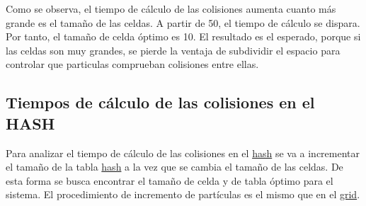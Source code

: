 \documentclass{article}
\begin{document}
Como se observa, el tiempo de cálculo de las colisiones aumenta cuanto más grande es el tamaño de las celdas. A partir de 50, el tiempo de cálculo se dispara. Por tanto, el tamaño de celda óptimo es 10. El resultado es el esperado, porque si las celdas son muy grandes, se pierde la ventaja de subdividir el espacio para controlar que particulas comprueban colisiones entre ellas.

\subsection{Tiempos de cálculo de las colisiones en el HASH}\label{sec:fb-tiempos-hash}

Para analizar el tiempo de cálculo de las colisiones en el \hyperref[sec:hash]{hash} se va a incrementar el tamaño de la tabla \hyperref[sec:hash]{hash} a la vez que se cambia el tamaño de las celdas. De esta forma se busca encontrar el tamaño de celda y de tabla óptimo para el sistema. El procedimiento de incremento de partículas es el mismo que en el \hyperref[sec:grid]{grid}.
\end{document}
